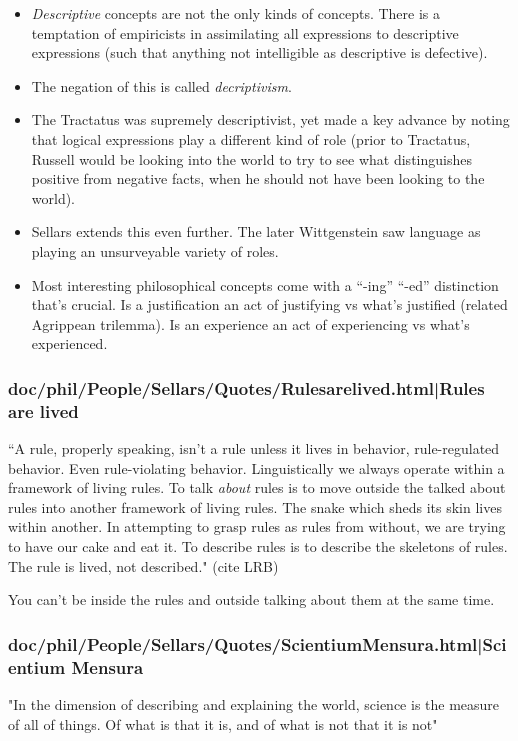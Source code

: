 \documentclass[12pt,a4paper]{report}
\begin{document}
\begin{itemize}
    \item \emph{Descriptive} concepts are not the only kinds of concepts. There
         is a temptation of empiricists in assimilating all expressions to
         descriptive expressions (such that anything not intelligible as
         descriptive is defective).
    \item The negation of this is called \emph{decriptivism}.
    \item The Tractatus was supremely descriptivist, yet made a key advance by
        noting that logical expressions play a different kind of role (prior to
        Tractatus, Russell would be looking into the world to try to see what
        distinguishes positive from negative facts, when he should not have
        been looking to the world).
    \item Sellars extends this even further. The later Wittgenstein saw
        language as playing an unsurveyable variety of roles.
    \item Most interesting philosophical concepts come with a ``-ing'' ``-ed''
        distinction that's crucial. Is a justification an act of justifying vs
        what's justified (related Agrippean trilemma). Is an experience an act
        of experiencing vs what's experienced.
\end{itemize}
\subsubsection{doc/phil/People/Sellars/Quotes/Rulesarelived.html|Rules are lived}
``A rule, properly speaking, isn't a rule unless it lives in behavior,
rule-regulated behavior. Even rule-violating behavior. Linguistically we always
operate within a framework of living rules. To talk \emph{about} rules is to
move outside the talked about rules into another framework of living rules. The
snake which sheds its skin lives within another. In attempting to grasp rules as
rules from without, we are trying to have our cake and eat it. To describe rules
is to describe the skeletons of rules. The rule is lived, not described."
(cite LRB)

You can't be inside the rules and outside talking about them at the same time.

\subsubsection{doc/phil/People/Sellars/Quotes/ScientiumMensura.html|Scientium Mensura}
"In the dimension of describing and explaining the world, science is the measure
of all of things. Of what is that it is, and of what is not that it is not"
\end{document}
